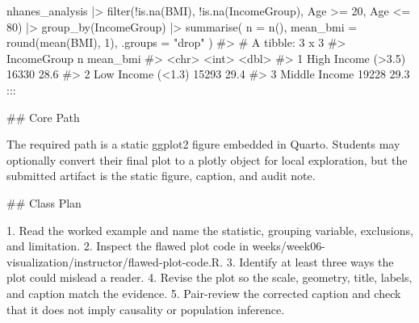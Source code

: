 \documentclass[
  letterpaper,
  DIV=11,
  numbers=noendperiod,
  oneside]{scrreprt}
\newenvironment{Shaded}{\begin{snugshade}}{\end{snugshade}}
\newcommand{\AttributeTok}[1]{\textcolor[rgb]{0.40,0.45,0.13}{#1}}
\newcommand{\CommentTok}[1]{\textcolor[rgb]{0.37,0.37,0.37}{#1}}
\newcommand{\DecValTok}[1]{\textcolor[rgb]{0.68,0.00,0.00}{#1}}
\newcommand{\FunctionTok}[1]{\textcolor[rgb]{0.28,0.35,0.67}{#1}}
\newcommand{\InformationTok}[1]{\textcolor[rgb]{0.37,0.37,0.37}{#1}}
\newcommand{\NormalTok}[1]{\textcolor[rgb]{0.00,0.23,0.31}{#1}}
\newcommand{\SpecialCharTok}[1]{\textcolor[rgb]{0.37,0.37,0.37}{#1}}
\newcommand{\SpecialStringTok}[1]{\textcolor[rgb]{0.13,0.47,0.30}{#1}}
\newcommand{\StringTok}[1]{\textcolor[rgb]{0.13,0.47,0.30}{#1}}
\begin{document}
\begin{Shaded}
\begin{Highlighting}[numbers=left,,]
\NormalTok{nhanes\_analysis }\SpecialCharTok{|\textgreater{}}
  \FunctionTok{filter}\NormalTok{(}\SpecialCharTok{!}\FunctionTok{is.na}\NormalTok{(BMI), }\SpecialCharTok{!}\FunctionTok{is.na}\NormalTok{(IncomeGroup), Age }\SpecialCharTok{\textgreater{}=} \DecValTok{20}\NormalTok{, Age }\SpecialCharTok{\textless{}=} \DecValTok{80}\NormalTok{) }\SpecialCharTok{|\textgreater{}}
  \FunctionTok{group\_by}\NormalTok{(IncomeGroup) }\SpecialCharTok{|\textgreater{}}
  \FunctionTok{summarise}\NormalTok{(}
    \AttributeTok{n =} \FunctionTok{n}\NormalTok{(),}
    \AttributeTok{mean\_bmi =} \FunctionTok{round}\NormalTok{(}\FunctionTok{mean}\NormalTok{(BMI), }\DecValTok{1}\NormalTok{),}
    \AttributeTok{.groups =} \StringTok{"drop"}
\NormalTok{  )}
\CommentTok{\#\textgreater{} \# A tibble: 3 x 3}
\CommentTok{\#\textgreater{}   IncomeGroup            n mean\_bmi}
\CommentTok{\#\textgreater{}   \textless{}chr\textgreater{}              \textless{}int\textgreater{}    \textless{}dbl\textgreater{}}
\CommentTok{\#\textgreater{} 1 High Income (\textgreater{}3.5) 16330     28.6}
\CommentTok{\#\textgreater{} 2 Low Income (\textless{}1.3)  15293     29.4}
\CommentTok{\#\textgreater{} 3 Middle Income      19228     29.3}
\InformationTok{\textasciigrave{}\textasciigrave{}\textasciigrave{}}
\NormalTok{:::}



\FunctionTok{\#\# Core Path}

\NormalTok{The required path is a static }\InformationTok{\textasciigrave{}ggplot2\textasciigrave{}}\NormalTok{ figure embedded in Quarto. Students may optionally convert their final plot to a }\InformationTok{\textasciigrave{}plotly\textasciigrave{}}\NormalTok{ object for local exploration, but the submitted artifact is the static figure, caption, and audit note.}

\FunctionTok{\#\# Class Plan}

\SpecialStringTok{1. }\NormalTok{Read the worked example and name the statistic, grouping variable, exclusions, and limitation.}
\SpecialStringTok{2. }\NormalTok{Inspect the flawed plot code in }\InformationTok{\textasciigrave{}weeks/week06{-}visualization/instructor/flawed{-}plot{-}code.R\textasciigrave{}}\NormalTok{.}
\SpecialStringTok{3. }\NormalTok{Identify at least three ways the plot could mislead a reader.}
\SpecialStringTok{4. }\NormalTok{Revise the plot so the scale, geometry, title, labels, and caption match the evidence.}
\SpecialStringTok{5. }\NormalTok{Pair{-}review the corrected caption and check that it does not imply causality or population inference.}


\end{Highlighting}
\end{Shaded}
\end{document}
